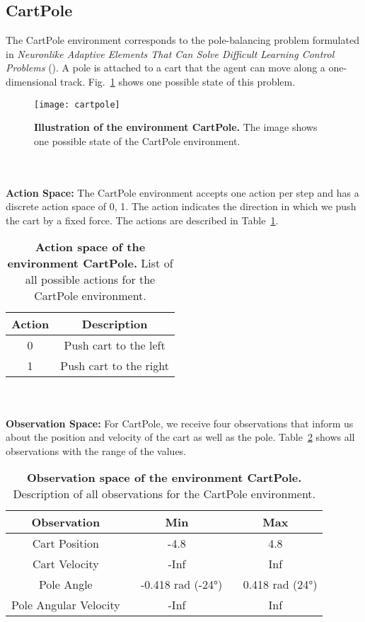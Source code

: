 \subsection{CartPole}
The CartPole environment corresponds to the pole-balancing problem formulated in \emph{Neuronlike Adaptive Elements That Can Solve Difficult Learning Control Problems} (\cite{6313077}). A pole is attached to a cart that the agent can move along a one-dimensional track. Fig.~\ref{fig:cartpole} shows one possible state of this problem.
\begin{figure}[!ht]
  \centering
\texttt{[image: cartpole]}
\caption[Illustration of the environment CartPole]{
  \textbf{Illustration of the environment CartPole.}
  The image shows one possible state of the CartPole environment.
}
\label{fig:cartpole}
\end{figure}
\\ \\
\textbf{Action Space:} The CartPole environment accepts one action per step and has a discrete action space of {0, 1}. The action indicates the direction in which we push the cart by a fixed force. The actions are described in Table~\ref{table:cartpole_act}.
\begin{table}[!ht]
  \centering
  \begin{tabular}{ |c|c| }
    \hline
    Action & Description \\
    \hline
    0 & Push cart to the left \\
    1 & Push cart to the right \\
    \hline
  \end{tabular}
  \caption[Action space of the environment CartPole]{
    \textbf{Action space of the environment CartPole.}
    List of all possible actions for the CartPole environment.
  }
  \label{table:cartpole_act}
\end{table}
\\ \\
\textbf{Observation Space:} For CartPole, we receive four observations that inform us about the position and velocity of the cart as well as the pole. Table~\ref{table:cartpole_obs} shows all observations with the range of the values.
\begin{table}[!ht]
  \centering
  \begin{tabular}{ |c|c|c| }
    \hline
    Observation & Min & Max \\
    \hline
    Cart Position & -4.8 & 4.8 \\
    Cart Velocity & -Inf & Inf \\
    Pole Angle & ~ -0.418 rad (-24°) & ~ 0.418 rad (24°) \\
    Pole Angular Velocity & -Inf & Inf \\
    \hline
  \end{tabular}
  \caption[Observation space of the environment CartPole]{
    \textbf{Observation space of the environment CartPole.}
    Description of all observations for the CartPole environment.
  }
  \label{table:cartpole_obs}
\end{table}
